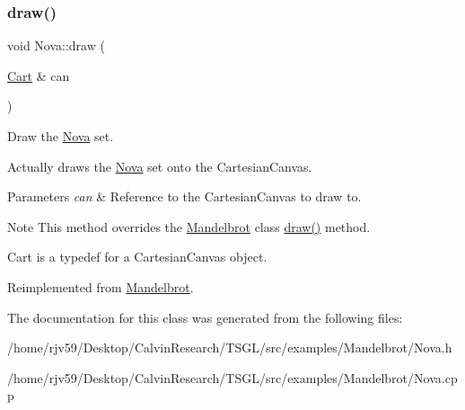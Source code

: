 \subsubsection{\texorpdfstring{draw()}{draw()}}
{\footnotesize\ttfamily void Nova\+::draw (\begin{DoxyParamCaption}\item[{\hyperlink{classtsgl_1_1_cartesian_canvas}{Cart} \&}]{can }\end{DoxyParamCaption})\hspace{0.3cm}{\ttfamily [virtual]}}



Draw the \hyperlink{class_nova}{Nova} set. 

Actually draws the \hyperlink{class_nova}{Nova} set onto the Cartesian\+Canvas. 
\begin{DoxyParams}{Parameters}
{\em can} & Reference to the Cartesian\+Canvas to draw to. \\
\hline
\end{DoxyParams}
\begin{DoxyNote}{Note}
This method overrides the \hyperlink{class_mandelbrot}{Mandelbrot} class\textquotesingle{} \hyperlink{class_nova_a66935ba0814dfabcae2481c128c336ec}{draw()} method. 

Cart is a typedef for a Cartesian\+Canvas object. 
\end{DoxyNote}


Reimplemented from \hyperlink{class_mandelbrot_ab7918e4de8f00f73290f110ca7a6cffd}{Mandelbrot}.



The documentation for this class was generated from the following files\+:\begin{DoxyCompactItemize}
\item 
/home/rjv59/\+Desktop/\+Calvin\+Research/\+T\+S\+G\+L/src/examples/\+Mandelbrot/Nova.\+h\item 
/home/rjv59/\+Desktop/\+Calvin\+Research/\+T\+S\+G\+L/src/examples/\+Mandelbrot/Nova.\+cpp\end{DoxyCompactItemize}
